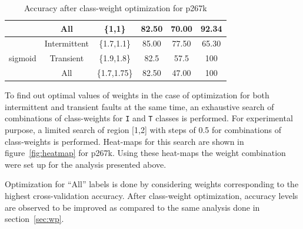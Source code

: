 \begin{table}[h]
\begin{tabular}{cccccc}
                            & All                               & \{1,1\}                                           & 82.50          & 70.00           & 92.34                        \\
\hline
\multirow{3}{*}{sigmoid}    & Intermittent                            & \{1.7,1.1\}                                       & 85.00          & 77.50           & 65.30                      \\
                            & Transient                               & \{1.9,1.8\}                                       & 82.5           & 57.5            & 100                       \\

                            & All                               & \{1.7,1.75\}                                           & 82.50          & 47.00           & 100                        \\
\hline
\end{tabular}
\caption{Accuracy after class-weight optimization for p267k}
\label{tab:optp267k}
\end{table}

To find out optimal values of weights in the case of optimization for both intermittent and transient faults at the same time, an exhaustive search of combinations of class-weights for \texttt{I} and \texttt{T} classes is performed. For experimental purpose, a limited search of region [1,2] with steps of 0.5 for combinations of class-weights is performed. Heat-maps for this search are shown in figure~\ref{fig:heatmap} for p267k. Using these heat-maps the weight combination were set up for the analysis presented above.

Optimization for \enquote{All} labels is done by considering weights corresponding to the highest cross-validation accuracy. After class-weight optimization, accuracy levels are observed to be improved as compared to the same analysis done in section~\ref{sec:wp}.


